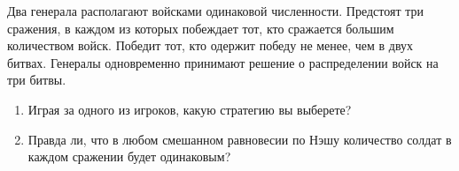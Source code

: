 \begin{problem}
Два генерала располагают войсками одинаковой численности. Предстоят три сражения, в каждом из которых побеждает тот, кто сражается большим количеством войск. Победит тот, кто одержит победу не менее, чем в двух битвах. Генералы одновременно принимают решение о распределении войск на три битвы. 
\begin{enumerate}

\item
Играя за одного из игроков, какую стратегию вы выберете?

\item Правда ли, что в любом смешанном равновесии по Нэшу количество солдат в каждом сражении будет одинаковым? 

\end{enumerate}


\begin{sol}

\end{sol}
\end{problem}










